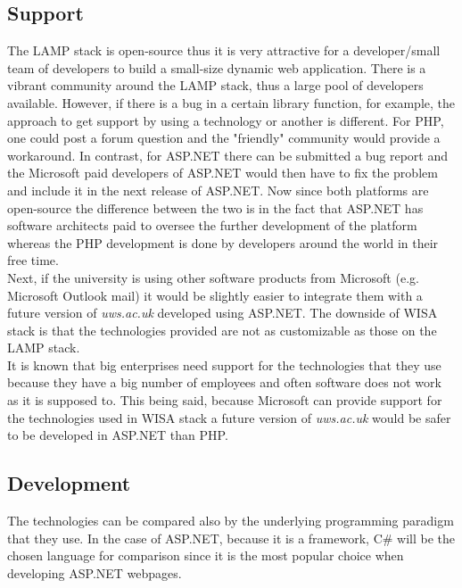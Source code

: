\documentclass[11]{article}
\begin{document}
	\subsection{Support}
		The LAMP stack  is open-source thus it is very attractive for a developer/small team of developers to build a small-size dynamic web application. There is a vibrant community around the LAMP stack, thus a large pool of developers available. However, if there is a bug in a certain library function, for example, the approach to get support by using a technology or another is different. For PHP, one could post a forum question and the "friendly" community would provide a workaround. In contrast, for ASP.NET there can be submitted a bug report and the Microsoft paid developers of ASP.NET would then have to fix the problem and include it in the next release of ASP.NET. Now since both platforms are open-source the difference between the two is in the fact that ASP.NET has software architects  paid to oversee the further development of the platform whereas the PHP development is done by developers around the world in their free time.\\
	\indent
	Next, if the university is using other software products from Microsoft (e.g. Microsoft Outlook mail) it would be slightly easier to integrate them with a future version of \textit{uws.ac.uk} developed using ASP.NET. The downside of WISA stack is that the technologies provided are not as customizable as those on the LAMP stack.\\
	
	\indent
	It is known that big enterprises need support for the technologies that they use because they have a big number of employees and often software does not work as it is supposed to. This being said, because Microsoft can provide support for the technologies used in WISA stack a future version of \textit{uws.ac.uk} would be safer to be developed in ASP.NET than PHP.\\

	\subsection{Development}
	The technologies can be compared also by the underlying programming paradigm that they use. In the case of ASP.NET, because it is a framework, C\# will be the chosen language for comparison since it is the most popular choice when developing ASP.NET webpages. \\
	
\end{document}
